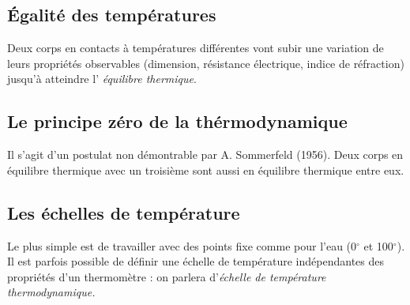 	\subsection{Égalité des températures}
	Deux corps en contacts à températures différentes vont subir une 
	variation de leurs propriétés observables (dimension, résistance 
	électrique, indice de réfraction) jusqu'à atteindre l'\textit{
	équilibre thermique}.
	
	\subsection{Le principe zéro de la thérmodynamique}
	Il s'agit d'un postulat non démontrable par A. Sommerfeld (1956). 
	Deux corps en équilibre thermique avec un troisième sont aussi 
	en équilibre thermique entre eux.
	
	\subsection{Les échelles de température}
	Le plus simple est de travailler avec des points fixe comme pour 
	l'eau (0$^\circ$ et 100$^\circ$). Il est parfois possible de 
	définir une échelle de température indépendantes des propriétés 
	d'un thermomètre : on parlera d'\textit{échelle de température 
	thermodynamique.}
	
	
	
	
	
	
	
	
	
	
	
	
	
	
	
	
	
	
	
	
	
	
	
	
	
	
	
	
